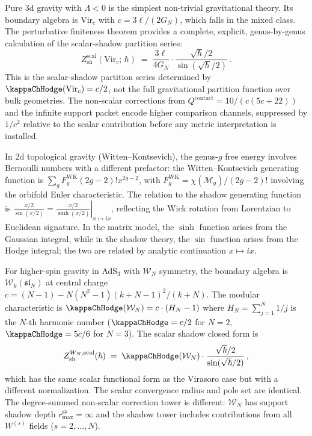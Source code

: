 \begin{remark}
Pure 3d gravity with $\Lambda < 0$ is the simplest non-trivial gravitational theory. Its boundary algebra is $\mathrm{Vir}_c$ with $c = 3\ell/(2G_N)$, which falls in the mixed class. The perturbative finiteness theorem provides a complete, explicit, genus-by-genus calculation of the scalar-shadow partition series:
\[
Z_{\mathrm{sh}}^{\mathrm{scal}}(\mathrm{Vir}_c;\,\hbar)
\;=\; \frac{3\ell}{4G_N} \cdot
\frac{\sqrt{\hbar}/2}{\sin(\sqrt{\hbar}/2)}\,.
\]
This is the scalar-shadow partition series determined by
\(\kappaChHodge(\mathrm{Vir}_c)=c/2\), not the full gravitational
partition function over bulk geometries.
The non-scalar corrections from $Q^{\mathrm{contact}} = 10/(c(5c+22))$ and the infinite support packet encode higher comparison channels, suppressed by $1/c^2$ relative to the scalar contribution before any metric interpretation is installed.
\end{remark}

\begin{remark}
In 2d topological gravity (Witten--Kontsevich), the genus-$g$ free energy involves Bernoulli numbers with a different prefactor: the Witten--Kontsevich generating function is $\sum_g F_g^{\mathrm{WK}} (2g-2)! x^{2g-2}$, with $F_g^{\mathrm{WK}} = \chi(\mathcal{M}_g) / (2g-2)!$ involving the orbifold Euler characteristic. The relation to the shadow generating function is $\frac{x/2}{\sin(x/2)} = \left.\frac{x/2}{\sinh(x/2)}\right|_{x \mapsto ix}$, reflecting the Wick rotation from Lorentzian to Euclidean signature. In the matrix model, the $\sinh$ function arises from the Gaussian integral, while in the shadow theory, the $\sin$ function arises from the Hodge integral; the two are related by analytic continuation $x \mapsto ix$.
\end{remark}

\begin{remark}
For higher-spin gravity in AdS$_3$ with $\mathcal{W}_N$ symmetry, the boundary algebra is $\mathcal{W}_k(\mathfrak{sl}_N)$ at central charge $c = (N-1) - N(N^2-1)(k+N-1)^2/(k+N)$. The modular characteristic is $\kappaChHodge(\mathcal{W}_N) = c \cdot (H_N - 1)$ where $H_N = \sum_{j=1}^N 1/j$ is the $N$-th harmonic number ($\kappaChHodge=c/2$ for $N=2$, $\kappaChHodge=5c/6$ for $N=3$). The scalar shadow closed form is
\[
Z_{\mathrm{sh}}^{W_N,\mathrm{scal}}(\hbar) \;=\; \kappaChHodge(\mathcal{W}_N) \cdot \frac{\sqrt{\hbar}/2}{\sin(\sqrt{\hbar}/2)}\,,
\]
which has the same scalar functional form as the Virasoro case but
with a different normalization. The scalar convergence radius and pole
set are identical. The degree-summed non-scalar correction tower is different:
$\mathcal{W}_N$ has support shadow depth \(r^\Theta_{\max}=\infty\)
and the shadow tower includes contributions from all $W^{(s)}$ fields
($s = 2, \ldots, N$).
\end{remark}

